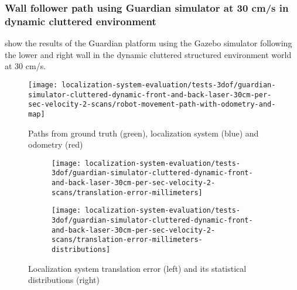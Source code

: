 \subsubsection{Wall follower path using Guardian simulator at 30 cm/s in dynamic cluttered environment}

 show the results of the Guardian platform using the Gazebo simulator following the lower and right wall in the dynamic cluttered structured environment world at 30 cm/s.

\begin{figure}[H]
	\centering
	\texttt{[image: localization-system-evaluation/tests-3dof/guardian-simulator-cluttered-dynamic-front-and-back-laser-30cm-per-sec-velocity-2-scans/robot-movement-path-with-odometry-and-map]}
	\caption{Paths from ground truth (green), localization system (blue) and odometry (red)}
	\label{fig:localization-system-evaluation_guardian-simulator-cluttered-dynamic-front-and-back-laser-30cm-per-sec-velocity-2-scans}
\end{figure}

\begin{figure}[H]
	\centering
	\begin{subfigure}[h]{0.47\textwidth}
		\centering
		\texttt{[image: localization-system-evaluation/tests-3dof/guardian-simulator-cluttered-dynamic-front-and-back-laser-30cm-per-sec-velocity-2-scans/translation-error-millimeters]}
	\end{subfigure}
	\begin{subfigure}[h]{0.47\textwidth}
		\centering
		\texttt{[image: localization-system-evaluation/tests-3dof/guardian-simulator-cluttered-dynamic-front-and-back-laser-30cm-per-sec-velocity-2-scans/translation-error-millimeters-distributions]}
	\end{subfigure}
	\caption{Localization system translation error (left) and its statistical distributions (right)}
	\label{fig:localization-system-evaluation_guardian-simulator-cluttered-dynamic-front-and-back-laser-30cm-per-sec-velocity-2-scans_translation-errors}
\end{figure}

